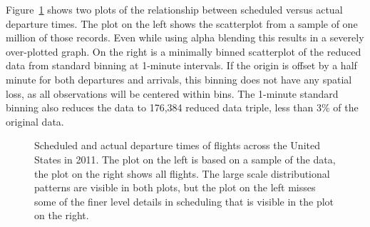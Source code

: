 \documentclass[11pt]{isuthesis}\usepackage[]{graphicx}\usepackage[]{color}
\newcommand{\ktm}[1]{{\color{red} #1}}
\begin{document}
Figure~\ref{airline-scatter} shows two plots of the relationship between scheduled versus actual departure times. The plot on the left shows the scatterplot from a sample of one million of those records. Even while using alpha blending this results in a severely over-plotted graph. On the right is a minimally binned scatterplot of the reduced data from standard binning at 1-minute intervals. If the origin is offset by a half minute for both departures and arrivals, this binning does not have any spatial loss, as all observations will be centered within bins. The 1-minute standard binning also reduces the data to 176,384 reduced data triple, less than 3\% of the original data.

\begin{figure}[hbtp]\centering
{}\hfill
{}
\caption{\label{airline-scatter}Scheduled and actual departure times of  flights across the United States in 2011. The plot on the left is based on a sample of the data, the plot on the right shows all flights. The large scale distributional patterns are visible in both plots, but the plot on the left misses some of the finer level details in scheduling that is visible in the plot on the right.}
\end{figure}
\end{document}
